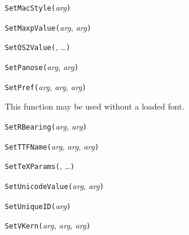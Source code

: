 \texttt{SetMacStyle(}\textit{arg}\texttt{)}



\texttt{SetMaxpValue(}\textit{arg}, \textit{arg}\texttt{)}



\texttt{SetOS2Value(}, \ldots\texttt{)}



\texttt{SetPanose(}\textit{arg}, \textit{arg}\texttt{)}



\texttt{SetPref(}\textit{arg}, \textit{arg}, \textit{arg}\texttt{)}

This function may be used without a loaded font.



\texttt{SetRBearing(}\textit{arg}, \textit{arg}\texttt{)}



\texttt{SetTTFName(}\textit{arg}, \textit{arg}, \textit{arg}\texttt{)}



\texttt{SetTeXParams(}, \ldots\texttt{)}



\texttt{SetUnicodeValue(}\textit{arg}, \textit{arg}\texttt{)}



\texttt{SetUniqueID(}\textit{arg}\texttt{)}



\texttt{SetVKern(}\textit{arg}, \textit{arg}, \textit{arg}\texttt{)}


